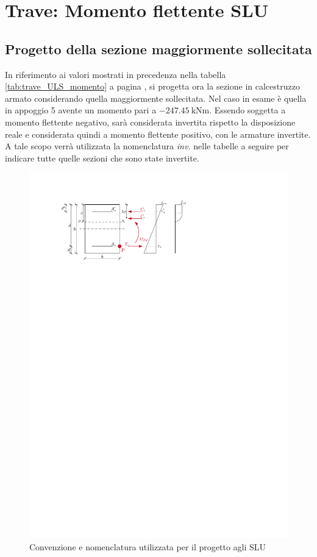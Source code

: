 \chapter{Trave: Momento flettente SLU}
\section{Progetto della sezione maggiormente sollecitata}
In riferimento ai valori mostrati in precedenza nella tabella \ref{tab:trave_ULS_momento} a pagina \pageref{tab:trave_ULS_momento}, si progetta ora la sezione in calcestruzzo armato considerando quella maggiormente sollecitata.
Nel caso in esame è quella in appoggio 5 avente un momento pari a $\SI{-247.45}{\kilo\newton\metre}$.
Essendo soggetta a momento flettente negativo, sarà considerata invertita rispetto la disposizione reale e considerata quindi a momento flettente positivo, con le armature invertite. 
A tale scopo verrà utilizzata la nomenclatura \emph{inv.} nelle tabelle a seguire per indicare tutte quelle sezioni che sono state invertite.

\begin{figure}[ht]
  \centering
  \includegraphics[height=0.25\textheight]{IMG/IPE_slu_progetto.pdf}
  \caption{Convenzione e nomenclatura utilizzata per il progetto agli SLU}
  \label{fig:slu_progetto}
\end{figure}

